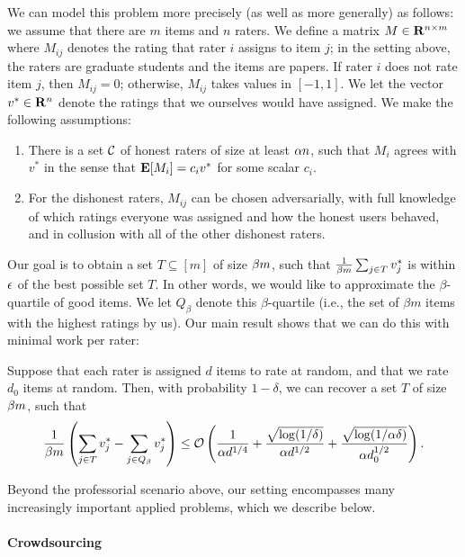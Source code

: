 We can model this problem more precisely (as well as more generally) as follows: 
we assume that there are $m$ items and $n$ raters. We define a matrix 
$M \in \mathbf{R}^{n \times m}$ where $M_{ij}$ denotes the rating that rater $i$ assigns 
to item $j$; in the setting above, the raters are graduate students and the items 
are papers. If rater $i$ does not rate item $j$, then $M_{ij} = 0$; otherwise, 
$M_{ij}$ takes values in $[-1,1]$. We let the vector $v^* \in \mathbf{R}^n$ denote the 
ratings that we ourselves would have assigned.
We make the following assumptions:
\begin{enumerate}
\item There is a set $\mathcal{C}$ of honest raters of size at least $\alpha n$, 
      such that $M_i$ agrees with $v^*$ in the sense that $\mathbf{E}[M_i] = c_i v^*$ 
      for some scalar $c_i$.
\item For the dishonest raters, $M_{ij}$ can be chosen adversarially, with full 
      knowledge of which ratings everyone was assigned and how the honest users 
      behaved, and in collusion with all of the other dishonest raters.
\end{enumerate}
Our goal is to obtain a set $T \subseteq [m]$ of size $\beta m$, such that 
$\frac{1}{\beta m} \sum_{j \in T} v_j^*$ is within $\epsilon$ of the best 
possible set $T$. In other words, we would like to approximate the 
$\beta$-quartile of good items. We let $Q_{\beta}$ denote this $\beta$-quartile 
(i.e., the set of $\beta m$ items with the highest ratings by us). 
Our main result shows that we can do this with minimal work per rater:
\begin{theorem}
\label{thm:main-1}
Suppose that each rater is assigned $d$ items to rate at random, and that we rate 
$d_0$ items at random. Then, with probability $1-\delta$, we can recover a 
set $T$ of size $\beta m$, such that
\[ \frac{1}{\beta m} \left(  \sum_{j \in T} v_j^* - \sum_{j \in Q_{\beta}} v_j^* \right) \leq \mathcal{O}\left( \frac{1}{\alpha d^{1/4}} + \frac{\sqrt{\log(1/\delta)}}{\alpha d^{1/2}} + \frac{\sqrt{\log(1/\alpha\delta)}}{\alpha d_0^{1/2}} \right). \]
\end{theorem}

Beyond the professorial scenario above, our setting encompasses many increasingly 
important applied problems, which we describe below.

\paragraph{Crowdsourcing}

